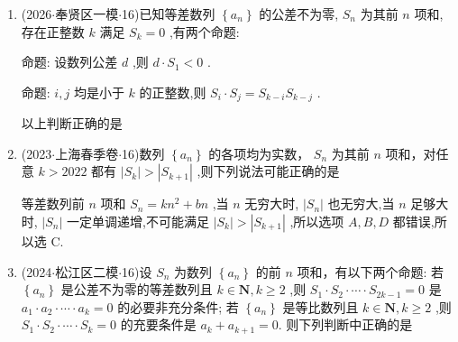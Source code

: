 \begin{enumerate}
    \item (2026$\cdot$奉贤区一模$\cdot$16)已知等差数列 $\left\{  {a}_{n}\right\}$ 的公差不为零, ${S}_{n}$ 为其前 $n$ 项和,存在正整数 $k$ 满足 ${S}_{k} = 0$ ,有两个命题:
    
    命题: 设数列公差 $d$ ,则 $d \cdot  {S}_{1} < 0$ .
    
    命题: $i, j$ 均是小于 $k$ 的正整数,则 ${S}_{i} \cdot  {S}_{j} = {S}_{k - i}{S}_{k - j}$ .
    
    以上判断正确的是
    \begin{jieda}
    \end{jieda}
    \item (2023$\cdot$上海春季卷$\cdot$16)数列 $\left\{  {a}_{n}\right\}$ 的各项均为实数， ${S}_{n}$ 为其前 $n$ 项和，对任意 $k > 2022$ 都有 $\left| {S}_{k}\right|  > \left| {S}_{k + 1}\right|$ ,则下列说法可能正确的是 

    \begin{jieda}
        等差数列前 $n$ 项和 ${S}_{n} = k{n}^{2} + {bn}$ ,当 $n$ 无穷大时, $\left| {S}_{n}\right|$ 也无穷大,当 $n$ 足够大时, $\left| {S}_{n}\right|$ 一定单调递增,不可能满足 $\left| {S}_{k}\right|  > \left| {S}_{k + 1}\right|$ ,所以选项 ${A},{B},{D}$ 都错误,所以选 C.
    \end{jieda}
    \item (2024$\cdot$松江区二模$\cdot$16)设 ${S}_{n}$ 为数列 $\left\{  {a}_{n}\right\}$ 的前 $n$ 项和，有以下两个命题:   若 $\left\{  {a}_{n}\right\}$ 是公差不为零的等差数列且 $k \in  \mathbf{N},k \geq  2$ ,则 ${S}_{1} \cdot  {S}_{2} \cdot  \cdots  \cdot  {S}_{{2k} - 1} = 0$ 是 ${a}_{1} \cdot  {a}_{2} \cdot  \cdots  \cdot  {a}_{k} = 0$ 的必要非充分条件;    若 $\left\{  {a}_{n}\right\}$ 是等比数列且 $k \in  \mathbf{N},k \geq  2$ ,则 ${S}_{1} \cdot  {S}_{2} \cdot  \cdots  \cdot  {S}_{k} = 0$ 的充要条件是 ${a}_{k} + {a}_{k + 1} = 0$. 则下列判断中正确的是 


\end{enumerate}
